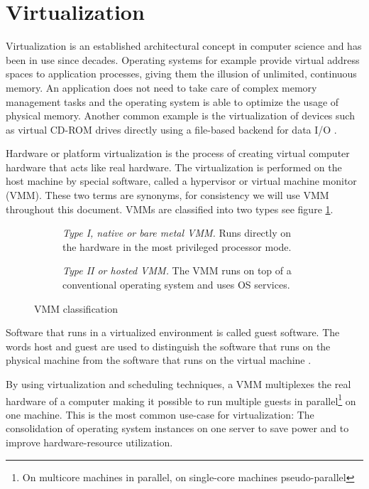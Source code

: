 \section{Virtualization}
Virtualization is an established architectural concept in computer science and
has been in use since decades. Operating systems for example provide virtual
address spaces to application processes, giving them the illusion of unlimited,
continuous memory. An application does not need to take care of complex memory
management tasks and the operating system is able to optimize the usage of
physical memory. Another common example is the virtualization of devices such as
virtual CD-ROM drives directly using a file-based backend for data I/O
\cite{CryptoCloud}.

Hardware or platform virtualization is the process of creating virtual computer
hardware that acts like real hardware. The virtualization is performed on the
host machine by special software, called a hypervisor or
virtual machine monitor (VMM). These two terms are synonyms, for
consistency we will use VMM throughout this document. VMMs are classified into
two types see figure \ref{fig:vmm-classification}.

\begin{figure}
	\centering
	\begin{subfigure}[b]{0.24\textwidth}
		\centering
		
		\caption{\emph{Type I, native or bare metal VMM.} Runs directly on the
		hardware in the most privileged processor mode.}
	\end{subfigure}
	\qquad
	\begin{subfigure}[b]{0.24\textwidth}
		\centering
		
		\caption{\emph{Type II or hosted VMM.} The VMM runs on top of a
		conventional operating system and uses OS services.}
	\end{subfigure}
	\caption{VMM classification}
	\label{fig:vmm-classification}
\end{figure}

Software that runs in a virtualized environment is called guest software. The
words host and guest are used to distinguish the software that runs on the
physical machine from the software that runs on the virtual machine
\cite{wiki:virtualization}.

By using virtualization and scheduling techniques, a VMM multiplexes the real
hardware of a computer making it possible to run multiple guests in
parallel\footnote{On multicore machines in parallel, on single-core machines
pseudo-parallel} on one machine. This is the most common use-case for
virtualization: The consolidation of operating system instances on one server to
save power and to improve hardware-resource utilization.

